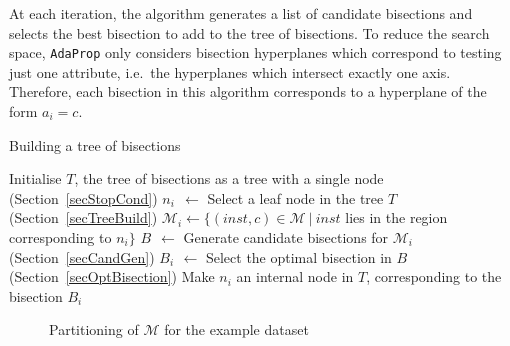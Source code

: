 \documentclass[a4paper,12pt]{article} %
\newcommand{\AdaProp}{\texttt{AdaProp}\xspace}
\newcommand{\mcl}[1]{\mathcal{#1}}
\begin{document}
At each iteration,
    the algorithm generates a list of candidate bisections and
    selects the best bisection to add to the tree of bisections.
To reduce the search space,
    \AdaProp only considers bisection hyperplanes which
    correspond to testing just one attribute, 
    i.e.\ the hyperplanes which intersect exactly one axis.
Therefore, each bisection in this algorithm
    corresponds to a hyperplane of the form $a_i = c$.

\begin{algorithm}
\caption{Building a tree of bisections}
\label{algoTree} 
\begin{algorithmic}
\State Initialise $T$, the tree of bisections as a tree with a single node
 \hfill (Section~\ref{secStopCond})
    \State $n_i ~~\gets$ Select a leaf node in the tree $T$ \hfill (Section~\ref{secTreeBuild})
    \State $\mcl{M}_i \gets \{ (inst,c) \in \mcl{M} ~|~ inst$ 
        lies in the region corresponding to $n_i \}$
    \State $B ~~\gets$ Generate candidate bisections for $\mcl{M}_i$ \hfill (Section~\ref{secCandGen})
    \State $B_i \,~\gets$ Select the optimal bisection in $B$ \hfill (Section~\ref{secOptBisection})
    \State Make $n_i$ an internal node in $T$, corresponding 
        to the bisection $B_i$
\EndWhile
\end{algorithmic}
\end{algorithm}

\begin{figure}
\begin{center}
\end{center}
\caption{Partitioning of $\mcl{M}$ for the example dataset}
\label{visMpart}
\end{figure}
\end{document}
